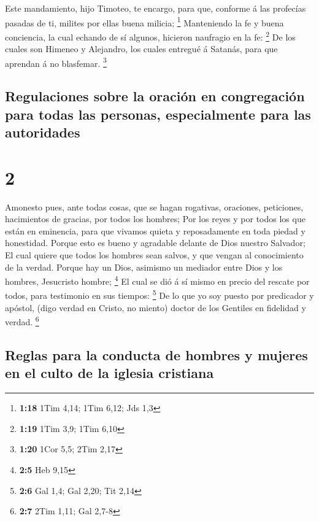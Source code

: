  Este mandamiento, hijo Timoteo, te encargo, para que,
conforme á las profecías pasadas de ti, milites por ellas buena milicia;
\footnote{\textbf{1:18} 1Tim 4,14; 1Tim 6,12; Jds 1,3} 
Manteniendo la fe y buena conciencia, la cual echando de sí algunos,
hicieron naufragio en la fe: \footnote{\textbf{1:19} 1Tim 3,9; 1Tim 6,10}
 De los cuales son Himeneo y Alejandro, los cuales
entregué á Satanás, para que aprendan á no blasfemar. \footnote{\textbf{1:20}
  1Cor 5,5; 2Tim 2,17}

\hypertarget{regulaciones-sobre-la-oraciuxf3n-en-congregaciuxf3n-para-todas-las-personas-especialmente-para-las-autoridades}{%
\subsection{Regulaciones sobre la oración en congregación para todas las
personas, especialmente para las
autoridades}\label{regulaciones-sobre-la-oraciuxf3n-en-congregaciuxf3n-para-todas-las-personas-especialmente-para-las-autoridades}}

\hypertarget{section-1}{%
\section{2}\label{section-1}}

 Amonesto pues, ante todas cosas, que se hagan rogativas,
oraciones, peticiones, hacimientos de gracias, por todos los hombres;
 Por los reyes y por todos los que están en eminencia,
para que vivamos quieta y reposadamente en toda piedad y honestidad.
 Porque esto es bueno y agradable delante de Dios nuestro
Salvador;  El cual quiere que todos los hombres sean
salvos, y que vengan al conocimiento de la verdad.  Porque
hay un Dios, asimismo un mediador entre Dios y los hombres, Jesucristo
hombre; \footnote{\textbf{2:5} Heb 9,15}  El cual se dió á
sí mismo en precio del rescate por todos, para testimonio en sus
tiempos: \footnote{\textbf{2:6} Gal 1,4; Gal 2,20; Tit 2,14}
 De lo que yo soy puesto por predicador y apóstol, (digo
verdad en Cristo, no miento) doctor de los Gentiles en fidelidad y
verdad. \footnote{\textbf{2:7} 2Tim 1,11; Gal 2,7-8}

\hypertarget{reglas-para-la-conducta-de-hombres-y-mujeres-en-el-culto-de-la-iglesia-cristiana}{%
\subsection{Reglas para la conducta de hombres y mujeres en el culto de
la iglesia
cristiana}\label{reglas-para-la-conducta-de-hombres-y-mujeres-en-el-culto-de-la-iglesia-cristiana}}

